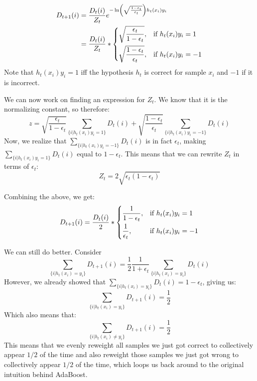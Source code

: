 \documentclass{article}
\begin{document}
\begin{align*}
    D_{t+1}(i) &= \frac{D_{t}(i)}{Z_t}e^{-\ln\left(\sqrt{\frac{1 -
    \epsilon_t}{\epsilon_t}}\right)h_t(x_i) y_i} \\
    &= \frac{D_{t}(i)}{Z_t} * \begin{dcases}
        \sqrt{\frac{\epsilon_t}{1 - \epsilon_t}},
            & \text{if } h_t(x_i)y_i = 1 \\
        \sqrt{\frac{1 - \epsilon_t}{\epsilon_t}},
            & \text{if } h_t(x_i)y_i = -1
    \end{dcases}
\end{align*}
Note that $h_t(x_i)y_i = 1$ iff the hypothesis $h_t$ is correct for sample
$x_i$ and $-1$ if it is incorrect.

We can now work on finding an expression for $Z_t$. We know that it is the
normalizing constant, so therefore:
\begin{equation*}
    z = \sqrt{\frac{\epsilon_t}{1 - \epsilon_t}} \sum_{\{i | h_t(x_i)y_i =
    1\}} D_t(i) + \sqrt{\frac{1 - \epsilon_t}{\epsilon_t}}
    \sum_{\{i | h_t(x_i)y_i = -1\}} D_t(i)
\end{equation*}
Now, we realize that $\sum_{\{i | h_t(x_i)y_i = -1\}} D_t(i)$ is in fact
$\epsilon_t$, making $\sum_{\{i | h_t(x_i)y_i = 1\}} D_t(i)$ equal to $1 -
\epsilon_t$. This means that we can rewrite $Z_t$ in terms of $\epsilon_t$:
\begin{equation*}
    Z_t = 2\sqrt{\epsilon_t (1 - \epsilon_t)}
\end{equation*}

Combining the above, we get:
\begin{equation*}
    D_{t+1}(i) = \frac{D_t(i)}{2} * \begin{dcases}
        \frac{1}{1 - \epsilon_t}, & \text{if } h_t(x_i)y_i = 1 \\
        \frac{1}{\epsilon_t}, & \text{if } h_t(x_i)y_i = -1
    \end{dcases}
\end{equation*}

We can still do better. Consider
\begin{equation*}
    \sum_{\{i | h_t(x_i) = y_i\}} D_{t+1}(i) = \frac{1}{2} \frac{1}{1 +
    \epsilon_t} \sum_{\{i | h_t(x_i) = y_i\}} D_{t}(i)
\end{equation*}
However, we already showed that $\sum_{\{i | h_t(x_i) = y_i\}} D_{t}(i) = 1
- \epsilon_t$, giving us:
\begin{equation*}
    \sum_{\{i | h_t(x_i) = y_i\}} D_{t+1}(i) = \frac{1}{2}
\end{equation*}
Which also means that:
\begin{equation*}
    \sum_{\{i | h_t(x_i) \neq y_i\}} D_{t+1}(i) = \frac{1}{2}
\end{equation*}
This means that we evenly reweight all samples we just got correct to
collectively appear $1/2$ of the time and also reweight those samples we just
got wrong to collectively appear $1/2$ of the time, which loops us back around
to the original intuition behind AdaBoost.
\end{document}
